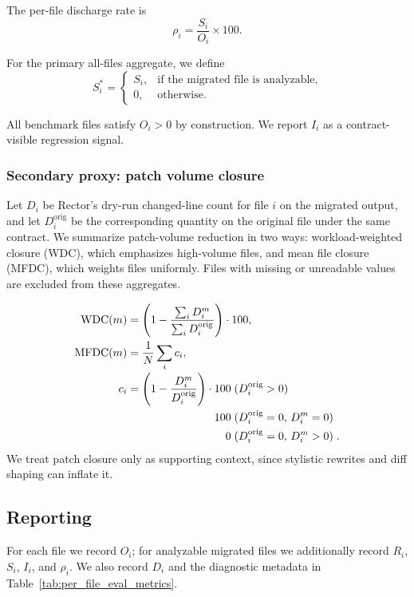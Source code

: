 The per-file discharge rate is
\[
\rho_i = \frac{S_i}{O_i}\times 100.
\]

For the primary all-files aggregate, we define
\[
S_i^*=
\begin{cases}
S_i, & \text{if the migrated file is analyzable,}\\
0, & \text{otherwise.}
\end{cases}
\]

All benchmark files satisfy $O_i>0$ by construction. We report $I_i$ as a contract-visible regression signal.

\subsubsection{Secondary proxy: patch volume closure}
\label{sec:pce_depth}

Let $D_i$ be Rector's dry-run changed-line count for file $i$ on the migrated output, and let $D_i^{\mathrm{orig}}$ be the corresponding quantity on the original file under the same contract. We summarize patch-volume reduction in two ways: workload-weighted closure (WDC), which emphasizes high-volume files, and mean file closure (MFDC), which weights files uniformly. Files with missing or unreadable values are excluded from these aggregates.

\providecommand{\WDC}{\textnormal{WDC}}
\providecommand{\MFDC}{\mathrm{MFDC}}
{\footnotesize
\begin{align}
\WDC(m)
&= \left(1-\frac{\sum_i D_i^{m}}{\sum_i D_i^{\mathrm{orig}}}\right)\cdot 100,\\
\MFDC(m)
&= \frac{1}{N}\sum_i c_i,\\[-2pt]
c_i
&=
\begin{aligned}[t]
\left(1-\frac{D_i^{m}}{D_i^{\mathrm{orig}}}\right)\cdot 100 \;& (D_i^{\mathrm{orig}}>0)\\
100 \;& (D_i^{\mathrm{orig}}=0,\, D_i^{m}=0)\\
0 \;& (D_i^{\mathrm{orig}}=0,\, D_i^{m}>0)\;.
\end{aligned}
\end{align}
}
We treat patch closure only as supporting context, since stylistic rewrites and diff shaping can inflate it.

\subsection{Reporting}
\label{sec:pce_interpretation}

For each file we record $O_i$; for analyzable migrated files we additionally record $R_i$, $S_i$, $I_i$, and $\rho_i$. We also record $D_i$ and the diagnostic metadata in Table~\ref{tab:per_file_eval_metrics}.

